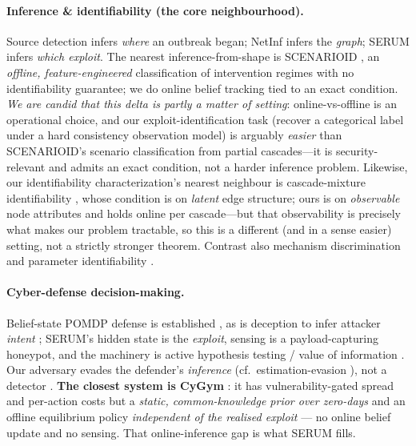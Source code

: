 \documentclass[11pt]{article}
\begin{document}
\paragraph{Inference \& identifiability (the core neighbourhood).} Source
detection \citep{shah2011rumors} infers \emph{where} an outbreak began; NetInf
\citep{gomez2010netinf} infers the \emph{graph}; SERUM infers \emph{which
exploit}. The nearest inference-from-shape is SCENARIOID \citep{scenarioid2023},
an \emph{offline, feature-engineered} classification of intervention regimes with
no identifiability guarantee; we do online belief tracking tied to an exact
condition. \emph{We are candid that this delta is partly a matter of setting}:
online-vs-offline is an operational choice, and our exploit-identification task
(recover a categorical label under a hard consistency observation model) is
arguably \emph{easier} than SCENARIOID's scenario classification from partial
cascades---it is security-relevant and admits an exact condition, not a harder
inference problem. Likewise, our identifiability characterization's nearest
neighbour is cascade-mixture identifiability \citep{hoffmann2020mixtures}, whose
condition is on \emph{latent} edge structure; ours is on \emph{observable} node
attributes and holds online per cascade---but that observability is precisely what
makes our problem tractable, so this is a different (and in a sense easier)
setting, not a strictly stronger theorem. Contrast also mechanism discrimination
\citep{cencetti2023contagion} and parameter identifiability
\citep{kiss2023identifiability}.

\paragraph{Cyber-defense decision-making.} Belief-state POMDP defense is
established \citep{miehling2015pomdp,miehling2018pomdp}, as is deception to infer
attacker \emph{intent} \citep{shinde2020deception}; SERUM's hidden state is the
\emph{exploit}, sensing is a payload-capturing honeypot, and the machinery is
active hypothesis testing \citep{naghshvar2013active} / value of information
\citep{leskovec2007celf}. Our adversary evades the defender's \emph{inference}
(cf.\ estimation-evasion \citep{shokri2012location,fanti2015spy}), not a detector
\citep{biggio2013evasion}. \textbf{The closest system is CyGym}
\citep{cygym2025}: it has vulnerability-gated spread and per-action costs but a
\emph{static, common-knowledge prior over zero-days} and an offline equilibrium
policy \emph{independent of the realised exploit} --- no online belief update and
no sensing. That online-inference gap is what SERUM fills.
\end{document}
